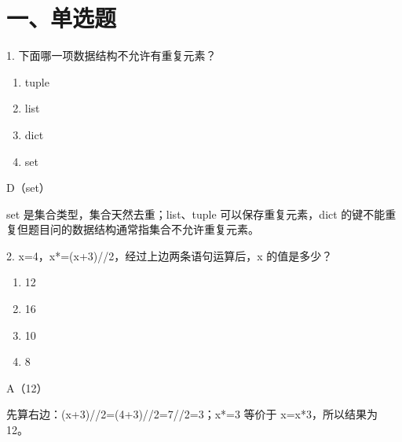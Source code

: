 
\begin{abstract}
这是一份《创新实践与展示》MOOC 题目与答案整理，依据 PDF 文档重新提取并排版，按单选题、多选题、判断题和填空题归类。
\end{abstract}

\section{一、单选题}

\begin{question}{1. 下面哪一项数据结构不允许有重复元素？}
\begin{enumerate}[label=\Alph*., leftmargin=2.4em, itemsep=0.2em]
\item tuple
\item list
\item dict
\item set
\end{enumerate}
\end{question}
\begin{answer}
D（set）
\end{answer}
\begin{explanation}
set 是集合类型，集合天然去重；list、tuple 可以保存重复元素，dict 的键不能重复但题目问的数据结构通常指集合不允许重复元素。
\end{explanation}

\begin{question}{2. x=4，x*=(x+3)//2，经过上边两条语句运算后，x 的值是多少？}
\begin{enumerate}[label=\Alph*., leftmargin=2.4em, itemsep=0.2em]
\item 12
\item 16
\item 10
\item 8
\end{enumerate}
\end{question}
\begin{answer}
A（12）
\end{answer}
\begin{explanation}
先算右边：(x+3)//2=(4+3)//2=7//2=3；x*=3 等价于 x=x*3，所以结果为 12。
\end{explanation}

